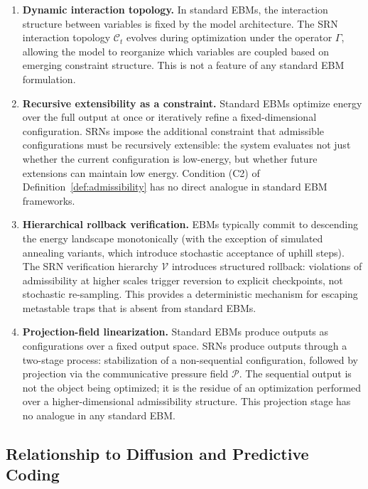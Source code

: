 \documentclass[11pt, a4paper]{article}
\theoremstyle{srn}
\theoremstyle{srnremark}
\newcommand{\Cstruct}{\mathcal{C}}           %
\newcommand{\Gop}{\Gamma}              %
\begin{document}
\begin{enumerate}
  \item \textbf{Dynamic interaction topology.}
    In standard EBMs, the interaction structure between variables is
    fixed by the model architecture.
    The SRN interaction topology $\Cstruct_t$ evolves during
    optimization under the operator $\Gop$, allowing the model to
    reorganize which variables are coupled based on emerging constraint
    structure.
    This is not a feature of any standard EBM formulation.

  \item \textbf{Recursive extensibility as a constraint.}
    Standard EBMs optimize energy over the full output at once or
    iteratively refine a fixed-dimensional configuration.
    SRNs impose the additional constraint that admissible configurations
    must be recursively extensible: the system evaluates not just
    whether the current configuration is low-energy, but whether future
    extensions can maintain low energy.
    Condition (C2) of Definition~\ref{def:admissibility} has no direct
    analogue in standard EBM frameworks.

  \item \textbf{Hierarchical rollback verification.}
    EBMs typically commit to descending the energy landscape monotonically
    (with the exception of simulated annealing variants, which introduce
    stochastic acceptance of uphill steps).
    The SRN verification hierarchy $\mathcal{V}$ introduces structured
    rollback: violations of admissibility at higher scales trigger
    reversion to explicit checkpoints, not stochastic re-sampling.
    This provides a deterministic mechanism for escaping metastable
    traps that is absent from standard EBMs.

  \item \textbf{Projection-field linearization.}
    Standard EBMs produce outputs as configurations over a fixed output
    space.
    SRNs produce outputs through a two-stage process: stabilization of
    a non-sequential configuration, followed by projection via the
    communicative pressure field $\mathcal{P}$.
    The sequential output is not the object being optimized; it is the
    residue of an optimization performed over a higher-dimensional
    admissibility structure.
    This projection stage has no analogue in any standard EBM.
\end{enumerate}

\subsection{Relationship to Diffusion and Predictive Coding}
\end{document}
